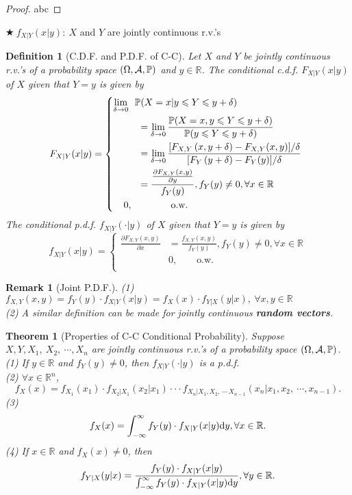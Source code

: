 \documentclass[openany,12pt]{book}
\newtheorem{theorem}{Theorem}[chapter]
\newtheorem{remark}{Remark}[chapter]
\newtheorem{definition}{Definition}[chapter]
\begin{document}
\begin{proof}
  abc
\end{proof}

$\bigstar\ f_{X|Y}(x|y):\ X$ and $Y$ are jointly continuous r.v.'s

\begin{definition}[C.D.F. and P.D.F. of C-C]
Let $X$ and $Y$ be jointly continuous r.v.'s of a probability
space $(\Omega,\mathcal{A},\mathbb{P})$ and $y \in \mathbb{R}$. The conditional c.d.f. $F_{X|Y}(x|y)$ of $X$ given that $Y = y$ is given by
\[F_{X|Y}(x|y) = \left\{ \begin{aligned}
\lim_{\delta \to 0}&\ \ {\mathbb{P}( X = x | y \leqslant Y \leqslant y + \delta )}\\ 
&\quad= \lim_{\delta \to 0}\frac{\mathbb{P}( X = x,y \leqslant Y \leqslant y + \delta)}{\mathbb{P}( y \leqslant Y \leqslant y + \delta)} \\
&\quad= \lim_{\delta \to 0}\frac{[ F_{X,Y}\left( x,y + \delta \right) - F_{X,Y}(x,y)]/\delta}{[ F_{Y}\left( y + \delta \right) - F_{Y}(y)]/\delta} \\
&\quad= \frac{\frac{\partial F_{X,Y}(x,y)}{\partial y}}{f_{Y}(y)},f_{Y}(y) \neq 0,\forall x \in \mathbb{R} \\
0&, \qquad\qquad\mathrm{\text{o.w.}} \\
\end{aligned} \right.\ \]
The conditional p.d.f. $f_{X|Y}\left( \cdot | y \right)$ of $X$ given that $Y = y$ is given by
\[f_{X|Y}(x|y) = \left\{ \begin{aligned}
\frac{\partial F_{X,Y}(x,y)}{\partial x} &= \frac{f_{X,Y}(x,y)}{f_{Y}(y)},f_{Y}(y) \neq 0,\forall x \in \mathbb{R} \\
&0,\qquad\mathrm{\text{o.w.}} \\
\end{aligned} \right.\]
\end{definition}

\begin{remark}[Joint P.D.F.]
(1) $f_{X,Y}(x,y) = f_{Y}(y) \cdot f_{X|Y}(x|y) = f_{X}(x) \cdot f_{Y|X}(y|x),\ \forall x,y \in \mathbb{R}$\\
(2) A similar definition can be made for jointly continuous \textbf{random vectors}.
\end{remark}

\begin{theorem}[Properties of C-C Conditional Probability]
Suppose $X,Y,X_{1},\ X_{2},\ \cdots,X_{n}$ are jointly continuous r.v.'s of a probability space $(\Omega,\mathcal{A},\mathbb{P})$.\\
(1) If $y \in \mathbb{R}$ and $f_{Y}(y) \neq 0$, then $f_{X|Y}\left( \cdot | y \right)$ is a p.d.f.\\
(2) $\forall x \in \mathbb{R}^{n}$,
\[f_{X}(x) = f_{X_{1}}(x_{1}) \cdot f_{X_{2}|X_{1}}\left( x_{2}|x_{1} \right) \cdot \cdot \cdot f_{X_{n}|X_{1},X_{2},\ \cdots\,X_{n - 1}}\left( x_{n}|x_{1},x_{2},\ \cdots,x_{n - 1} \right).\]
(3)
\[f_{X}(x) = \int_{- \infty}^{\infty}{f_{Y}(y) \cdot f_{X|Y}(x|y)}\mathrm{d} y,\forall x \in \mathbb{R}.\]
(4) If $x \in \mathbb{R}$ and $f_{X}(x) \neq 0$, then
\[f_{Y|X}(y|x) = \frac{f_{Y}(y) \cdot f_{X|Y}(x|y)}{\int_{- \infty}^{\infty}{f_{Y}(y) \cdot f_{X|Y}(x|y)\mathrm{d} y}},\forall y \in \mathbb{R}.\]
\end{theorem}
\end{document}
